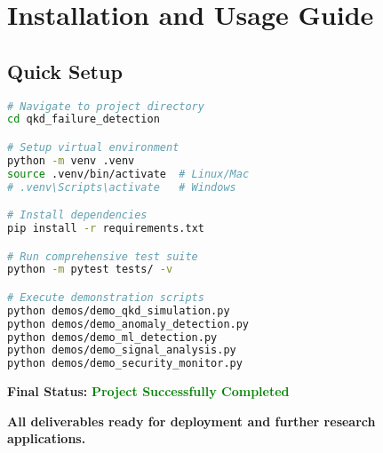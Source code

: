 \documentclass[12pt,a4paper]{article}
\begin{document}
\section{Installation and Usage Guide}

\subsection{Quick Setup}
\begin{lstlisting}[language=bash, caption=Installation Commands]
# Navigate to project directory
cd qkd_failure_detection

# Setup virtual environment
python -m venv .venv
source .venv/bin/activate  # Linux/Mac
# .venv\Scripts\activate   # Windows

# Install dependencies
pip install -r requirements.txt

# Run comprehensive test suite
python -m pytest tests/ -v

# Execute demonstration scripts
python demos/demo_qkd_simulation.py
python demos/demo_anomaly_detection.py
python demos/demo_ml_detection.py
python demos/demo_signal_analysis.py
python demos/demo_security_monitor.py
\end{lstlisting}

\textbf{Final Status:} \textcolor{green}{\checkmark \textbf{Project Successfully Completed}}

\textbf{All deliverables ready for deployment and further research applications.}
\end{document}

